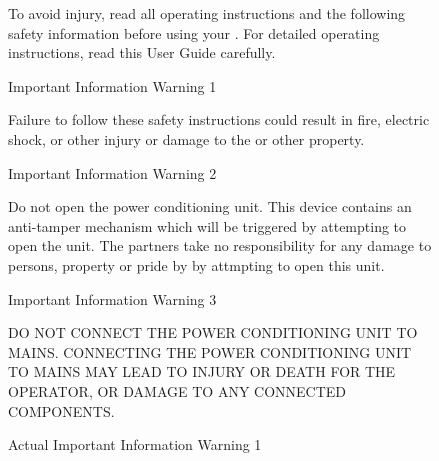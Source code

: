 
\begin{figure}[h!]
\centering
To avoid injury, read all operating instructions and the following safety information before using your \touchmore{}. For detailed operating instructions, read this User Guide carefully.
\caption{Important Information Warning 1}
\end{figure}

\begin{figure}[h!]
\centering
Failure to follow these safety instructions could result in fire, electric shock, or other injury or damage to the \touchmore{} or other property.
\caption{Important Information Warning 2}
\end{figure}

\begin{figure}[h!]
\centering
Do not open the \touchmore{} power conditioning unit. This device contains an anti-tamper mechanism which will be triggered by attempting to open the unit. The partners take no responsibility for any damage to persons, property or pride by by attmpting to open this unit.
\caption{Important Information Warning 3}
\end{figure}

\begin{figure}[h!]
\centering
DO NOT CONNECT THE \touchmore{} POWER CONDITIONING UNIT TO MAINS. CONNECTING THE \touchmore{} POWER CONDITIONING UNIT TO MAINS MAY LEAD TO INJURY OR DEATH FOR THE OPERATOR, OR DAMAGE TO ANY CONNECTED COMPONENTS.
\caption{Actual Important Information Warning 1}
\end{figure}
